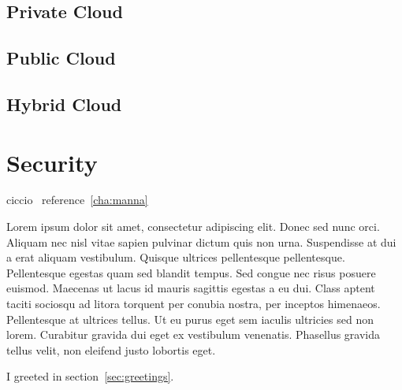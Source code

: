 \subsection{Private Cloud}
\subsection{Public Cloud}
\subsection{Hybrid Cloud}
\section{Security}

ciccio~\label{cha:manna}
reference~\ref{cha:manna}

Lorem ipsum dolor sit amet, consectetur adipiscing elit. Donec sed nunc orci. Aliquam nec nisl vitae sapien pulvinar dictum quis non urna. Suspendisse at dui a erat aliquam vestibulum. Quisque ultrices pellentesque pellentesque. Pellentesque egestas quam sed blandit tempus. Sed congue nec risus posuere euismod. Maecenas ut lacus id mauris sagittis egestas a eu dui. Class aptent taciti sociosqu ad litora torquent per conubia nostra, per inceptos himenaeos. Pellentesque at ultrices tellus. Ut eu purus eget sem iaculis ultricies sed non lorem. Curabitur gravida dui eget ex vestibulum venenatis. Phasellus gravida tellus velit, non eleifend justo lobortis eget. 


I greeted in section~\ref{sec:greetings}.